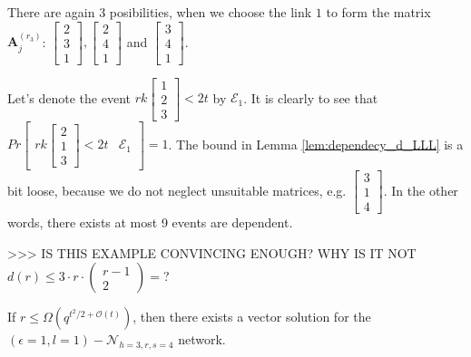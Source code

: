 \begin{example}
There are again 3 posibilities, when we choose the link $1$ to form
the matrix $\boldsymbol{A}_{j}^{\left(r_{3}\right)}$: $\left[\begin{array}{c}
2\\
3\\
1
\end{array}\right],\left[\begin{array}{c}
2\\
4\\
1
\end{array}\right]$ and $\left[\begin{array}{c}
3\\
4\\
1
\end{array}\right]$.

Let's denote the event $rk\left[\begin{array}{c}
1\\
2\\
3
\end{array}\right]<2t$ by $\mathcal{E}_{1}$. It is clearly to see that $Pr\left[\begin{array}{c|c}
rk\left[\begin{array}{c}
2\\
1\\
3
\end{array}\right]<2t & \mathcal{E}_{1}\end{array}\right]=1$. The bound in Lemma \ref{lem:dependecy_d_LLL} is a bit loose, because
we do not neglect unsuitable matrices, e.g. $\left[\begin{array}{c}
3\\
1\\
4
\end{array}\right]$. In the other words, there exists at most 9 events are dependent. 
\end{example}
>\textcompwordmark >\textcompwordmark > IS THIS EXAMPLE CONVINCING
ENOUGH? WHY IS IT NOT $d(r)\leq3\cdot r\cdot\left(\begin{array}{c}
r-1\\
2
\end{array}\right)=$?
\begin{thm}
If $r\leq\Omega\left(q^{t^{2}/2+\mathcal{O}\left(t\right)}\right)$,
then there exists a vector solution for the $\left(\epsilon=1,l=1\right)-\mathcal{N}_{h=3,r,s=4}$
network. \label{theo:r_for_vector_sol_e1l1h3rs4}
\end{thm}

